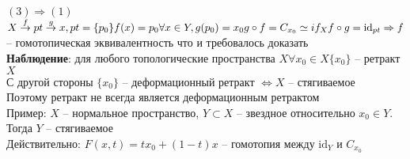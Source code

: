 	$(3) \Rightarrow (1)$ $X \overset{f}{\rightarrow} pt \overset{g}{\rightarrow} x, pt = \{p_0\}\\
	f(x) = p_0 \forall x\in Y, g(p_0) = x_0\\
	g \circ f = C_{x_0} \simeq if_X\\
	f \circ g =  \text{id}_{pt}\\
	\Rightarrow f$ -- гомотопическая эквивалентность что и требовалось доказать\\
	\textbf{Наблюдение}: для любого топологические пространства $X \forall x_0 \in X \{x_0\}$ -- ретракт $X$\\
	С другой стороны $\{x_0\}$ -- деформационный ретракт $\Leftrightarrow X$ -- стягиваемое\\
	Поэтому ретракт не всегда является деформационным ретрактом\\
	Пример: $X$ -- нормальное пространство, $Y\subset X$ -- звездное относительно $x_0 \in Y$. Тогда $Y$ -- стягиваемое\\
	Действительно: $F(x,t) = tx_0 + (1-t)x$ -- гомотопия между $ \text{id}_Y$ и $C_{x_0}$
	


\newpage
